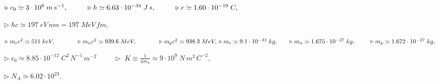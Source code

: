 \documentclass[a4paper,14pt]{exam}
\begin{document}
	
\vspace*{-2ex}

\vspace{\fill}
		
\begin{learn}
{
 $\triangleright\;c_0\simeq 3\cdot 10^8\;m\,s^{-1}, \hspace{1cm} \triangleright\; h\simeq 6.63\cdot 10^{-34}\;J\,s, \hspace*{1cm}\triangleright\; e\simeq 1.60\cdot 10^{-19}\;C,$
  \vspace{2ex}
  
  $%
  \triangleright\;\hbar c\simeq 197\;eV\,nm= 197\;MeV\,f\!m,$
  \vspace{2ex}
  
  $\triangleright\;m_ec^2\simeq 511\;keV,\hspace{1.3cm} \triangleright\;m_nc^2\simeq 939.6\;MeV,\hspace{1.3cm} \triangleright\;m_pc^2\simeq 938.3\;MeV,
  \newline
  \triangleright m_e\simeq 9.1\cdot 10^{-31}\;kg,\hspace{.65cm}\triangleright\; m_n\simeq1.675\cdot 10^{-27}\;kg,\hspace{.85cm}\triangleright\;m_p\simeq1.672\cdot 10^{-27}\;kg,$
   \vspace{2ex}
   
  $\triangleright\;\epsilon_0\simeq 8.85\cdot 10^{-12}\;C^2\,N^{-1}\,m^{-2}
  \hspace{1cm} \triangleright\;K\equiv\frac{1}{4\pi\epsilon_0}\simeq 9\cdot 10^9\;N\,m^2\,C^{-2},$
  \vspace{2ex}
  
  $\triangleright\;N_A\simeq 6.02\cdot 10^{23}.$

 
  
  
 

 
 }
\end{learn}
\end{document}
